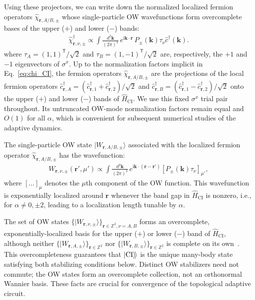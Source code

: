\documentclass[aps,prb,twocolumn,superscriptaddress,longbibliography,floatfix]{revtex4-2}
\newcommand{\ii}{\mathrm{i}}
\newcommand{\mr}[1]{\mathrm{#1}}
\newcommand{\bfr}{\boldsymbol r}
\newcommand{\kett}[1]{\ket{#1}\!\rangle}
\newcommand{\CI}{\kett{\mr{CI}}}
\theoremstyle{plain}
\theoremstyle{definition}
\theoremstyle{remark}
\begin{document}
Using these projectors, we can write down the normalized localized fermion operators $\hat\chi_{\bfr,A/B,\pm}$ whose single-particle OW wavefunctions form overcomplete bases of the upper ($+$) and lower ($-$) bands:
\begin{align}
    \hat\chi^\dagger_{\bfr,\nu,\pm}\propto
    \int\frac{d^2\boldsymbol k}{(2\pi)^2}\,
    e^{\ii\boldsymbol k\cdot\bfr}\,
     P_{\pm}(\boldsymbol k)\tau_{\nu}\hat c^\dagger(\boldsymbol k).
    \label{eq:chi_CI}
\end{align}
where $\tau_A=(1,1)^{\mathsf T}/\sqrt{2}$ and $\tau_B=(1,-1)^{\mathsf T}/\sqrt{2}$ are, respectively, the $+1$ and $-1$ eigenvectors of $\sigma^x$. Up to the normalization factors implicit in Eq.~\eqref{eq:chi_CI}, the fermion operators $\hat\chi_{\bfr,A/B,\pm}$ are the projections of the local fermion operators $\hat c^\dagger_{\bfr,A}=(\hat c^\dagger_{\bfr,1}+\hat c^\dagger_{\bfr,2})/\sqrt{2}$ and $\hat c^\dagger_{\bfr,B}=(\hat c^\dagger_{\bfr,1}-\hat c^\dagger_{\bfr,2})/\sqrt{2}$ onto the upper ($+$) and lower ($-$) bands of $\hat H_{\mr{CI}}$. We use this fixed $\sigma^x$ trial pair throughout. Its untruncated OW-mode normalization factors remain equal and $O(1)$ for all $\alpha$, which is convenient for subsequent numerical studies of the adaptive dynamics.

The single-particle OW state $|W_{\bfr, A/B, \pm}\rangle$ associated with the localized fermion operator $\hat{\chi}_{\bfr, A/B, \pm}$ has the wavefunction:
\begin{align}
     W_{\bfr,\nu,\pm}(\bfr',\mu')\propto
     \int\frac{d^2\boldsymbol k}{(2\pi)^2}\,
     e^{\ii\boldsymbol k\cdot(\bfr-\bfr')}\left[
     P_{\pm}(\boldsymbol k)\tau_{\nu} \right]_{\mu'},
\end{align}
where $[\dots]_\mu$ denotes the $\mu$th component of the OW function.
This wavefunction is exponentially localized around $\bfr$ whenever the band gap in $\hat H_{\mr{CI}}$ is nonzero, i.e., for $\alpha\neq0,\pm2$, leading to a localization length tunable by $\alpha$.

The set of OW states $\{\lvert W_{\bfr,\nu,\pm}\rangle\}_{\bfr\in\mathbb Z^2,\nu=A,B}$ forms an overcomplete, exponentially-localized basis for the upper ($+$) or lower ($-$) band of $\hat H_{\mr{CI}}$, although neither $\{\lvert W_{\bfr,A,\pm}\rangle\}_{\bfr\in\mathbb Z^2}$ nor $\{\lvert W_{\bfr,B,\pm}\rangle\}_{\bfr\in\mathbb Z^2}$ is complete on its own~\cite{Brouder2007,DubailRead2015,LiDongLedwithKhalaf2024}. This overcompleteness guarantees that $\CI$ is the unique many-body state satisfying both stabilizing conditions below. Distinct OW stabilizers need not commute; the OW states form an overcomplete collection, not an orthonormal Wannier basis. These facts are crucial for convergence of the topological adaptive circuit.
\end{document}

